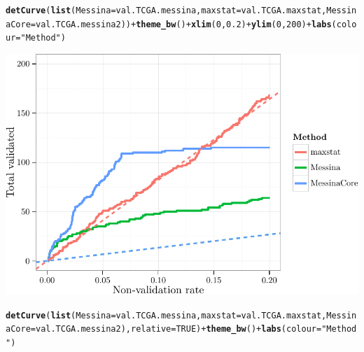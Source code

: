 \documentclass{article}\usepackage[]{graphicx}\usepackage[]{color}
\makeatletter
\def\maxwidth{ %
  \ifdim\Gin@nat@width>\linewidth
    \linewidth
  \else
    \Gin@nat@width
  \fi
}
\newcommand{\hlnum}[1]{\textcolor[rgb]{0.686,0.059,0.569}{#1}}%
\newcommand{\hlstr}[1]{\textcolor[rgb]{0.192,0.494,0.8}{#1}}%
\newcommand{\hlopt}[1]{\textcolor[rgb]{0,0,0}{#1}}%
\newcommand{\hlstd}[1]{\textcolor[rgb]{0.345,0.345,0.345}{#1}}%
\newcommand{\hlkwc}[1]{\textcolor[rgb]{0.333,0.667,0.333}{#1}}%
\newcommand{\hlkwd}[1]{\textcolor[rgb]{0.737,0.353,0.396}{\textbf{#1}}}%
\newenvironment{kframe}{%
 \def\at@end@of@kframe{}%
 \ifinner\ifhmode%
  \def\at@end@of@kframe{\end{minipage}}%
  \begin{minipage}{\columnwidth}%
 \fi\fi%
 \def\FrameCommand##1{\hskip\@totalleftmargin \hskip-\fboxsep
 \colorbox{shadecolor}{##1}\hskip-\fboxsep
     \hskip-\linewidth \hskip-\@totalleftmargin \hskip\columnwidth}%
 \MakeFramed {\advance\hsize-\width
   \@totalleftmargin\z@ \linewidth\hsize
   \@setminipage}}%
 {\par\unskip\endMakeFramed%
 \at@end@of@kframe}
\newenvironment{knitrout}{}{} %
\makeatother
\begin{document}
\begin{knitrout}
{}


\begin{kframe}\begin{alltt}
\hlkwd{detCurve}\hlstd{(}\hlkwd{list}\hlstd{(}\hlkwc{Messina} \hlstd{= val.TCGA.messina,} \hlkwc{maxstat} \hlstd{= val.TCGA.maxstat,} \hlkwc{MessinaCore} \hlstd{= val.TCGA.messina2))} \hlopt{+} \hlkwd{theme_bw}\hlstd{()} \hlopt{+} \hlkwd{xlim}\hlstd{(}\hlnum{0}\hlstd{,} \hlnum{0.2}\hlstd{)} \hlopt{+} \hlkwd{ylim}\hlstd{(}\hlnum{0}\hlstd{,} \hlnum{200}\hlstd{)} \hlopt{+} \hlkwd{labs}\hlstd{(}\hlkwc{colour} \hlstd{=} \hlstr{"Method"}\hlstd{)}
\end{alltt}


{\ttfamily\noindent\color{warningcolor}{\#\# Warning: Removed 28518 rows containing missing values (geom\_path).}}\end{kframe}

{\centering \includegraphics[width=\maxwidth]{figure/07-E3-E3-val-detcurves-5} 

}


\begin{kframe}\begin{alltt}
\hlkwd{detCurve}\hlstd{(}\hlkwd{list}\hlstd{(}\hlkwc{Messina} \hlstd{= val.TCGA.messina,} \hlkwc{maxstat} \hlstd{= val.TCGA.maxstat,} \hlkwc{MessinaCore} \hlstd{= val.TCGA.messina2),} \hlkwc{relative} \hlstd{=} \hlnum{TRUE}\hlstd{)} \hlopt{+} \hlkwd{theme_bw}\hlstd{()} \hlopt{+} \hlkwd{labs}\hlstd{(}\hlkwc{colour} \hlstd{=} \hlstr{"Method"}\hlstd{)}
\end{alltt}
\end{kframe}


\end{knitrout}
\end{document}
